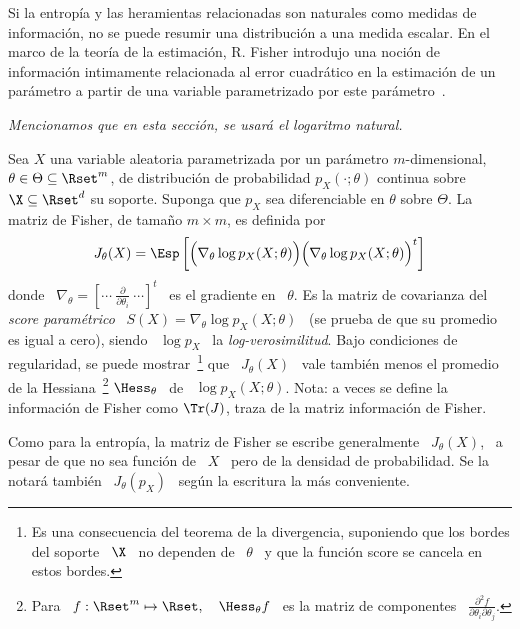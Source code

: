 




Si la  entrop\'ia y las heramientas  relacionadas son naturales  como medidas de
informaci\'on, no se  puede resumir una distribuci\'on a  una medida escalar. En
el marco de la teor\'ia de  la estimaci\'on, R. Fisher introdujo una noci\'on de
informaci\'on intimamente  relacionada al error cuadr\'atico  en la estimaci\'on
de   un  par\'ametro   a  partir   de  una   variable  parametrizado   por  este
par\'ametro~\cite{Fis22, Fis25:07, Kay93, Bos07, CovTho06, Fri04}.

{\it Mencionamos que en esta secci\'on, se usar\'a el logaritmo natural.}
%
\begin{definicion}
  Sea   $X$   una   variable   aleatoria  parametrizada   por   un   par\'ametro
  $m$-dimensional, $\theta  \in \Theta \subseteq \Rset^m$,  de distribuci\'on de
  probabilidad  $p_X(\cdot;\theta)$  continua sobre  $\X  \subseteq \Rset^d$  su
  soporte. Suponga  que $p_X$ sea  diferenciable en $\theta$ sobre  $\Theta$.  La
  matriz de Fisher, de tama\~no $m \times m$, es definida por
  \[
  J_\theta(X)  =  \Esp\left[  \Big(  \nabla_\theta \log  p_X(X;\theta)  \Big)
    \Big( \nabla_\theta \log p_X(X;\theta) \Big)^t \right]
  \]
  donde \  $\nabla_\theta = \left[ \cdots  \: \frac{\partial}{\partial \theta_i}
    \:  \cdots \right]^t$ \  es el  gradiente en  \ $\theta$.   Es la  matriz de
  covarianza  del  {\it  score  param\'etrico}  \  $S(X)  =  \nabla_\theta  \log
  p_X(X;\theta)$ \  (se prueba  de que su  promedio es  igual a cero),  siendo \
  $\log p_X$ \ la {\it  log-verosimilitud}.  Bajo condiciones de regularidad, se
  puede  mostrar~\footnote{Es una  consecuencia del  teorema de  la divergencia,
    suponiendo que los bordes del soporte \ $\X$ \ no dependen de \ $\theta$ \ y
    que la funci\'on  score se cancela en estos bordes.}   que \ $J_\theta(X)$ \
  vale tambi\'en menos  el promedio de la Hessiana~\footnote{Para  \ $f: \Rset^m
    \mapsto  \Rset,  \quad \Hess_\theta  f$  \ es  la  matriz  de componentes  \
    $\frac{\partial^2 f}{\partial \theta_i \partial \theta_j}$.}  $\Hess_\theta$
  \ de  \ $\log  p_X(X;\theta)$.  Nota:  a veces se  define la  informaci\'on de
  Fisher como $\Tr(J)$, traza de la matriz informaci\'on de Fisher.
\end{definicion}
%
Como  para  la  entrop\'ia,  la  matriz  de Fisher  se  escribe  generalmente  \
$J_\theta(X)$, \ a pesar de que no sea  funci\'on de \ $X$ \ pero de la densidad
de  probabilidad.  Se la  notar\'a  tambi\'en  \  $J_\theta(p_X)$ \  seg\'un  la
escritura la m\'as conveniente.

